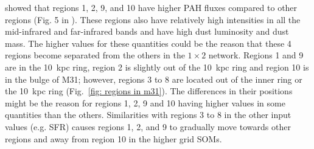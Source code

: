         \cite{Dim15} showed that regions 1, 2, 9, and 10 have higher PAH fluxes compared to other regions (Fig. 5 in \citealt{Dim15}). 
        These regions also have relatively high intensities in all the mid-infrared and far-infrared bands and have high dust luminosity and dust mass.
        The higher values for these quantities could be the reason that these 4 regions become separated from the others in the $1\times2$ network.
        Regions 1 and 9 are in the 10~kpc ring, region 2 is slightly out of the 10~kpc ring and region 10 is in the bulge of M31; however, regions 3 to 8 are located out of the inner ring or the 10~kpc ring (Fig.~\ref{fig: regions in m31}).   
        The differences in their positions might be the reason for regions 1, 2, 9 and 10 having higher values in some quantities than the others. 
        Similarities with regions 3 to 8 in the other input values (e.g. SFR) causes regions 1, 2, and 9 to gradually move towards other regions and away from region 10 in the higher grid SOMs.
        
        
